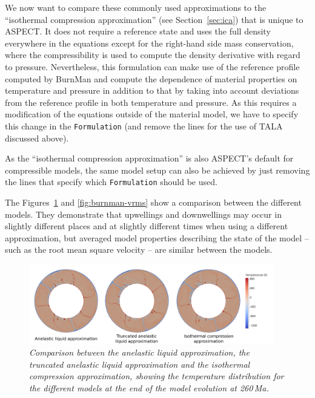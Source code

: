 \documentclass{article}
\newcommand{\aspect}{\textsc{ASPECT}}
\begin{document}
We now want to compare these commonly used approximations to the ``isothermal compression approximation''
(see Section~\ref{sec:ica}) that is unique to \aspect{}. It does not require a reference state and uses 
the full density everywhere in the equations except for the right-hand side  mass conservation, where the 
compressibility is used to compute the density derivative with regard to pressure. 
Nevertheless, this formulation can make use of the reference profile computed by BurnMan and compute the 
dependence of material properties on temperature and pressure in addition to that by taking into account 
deviations from the reference profile in both temperature and pressure. As this requires a modification 
of the equations outside of the material model, we have to specify this change in the 
\texttt{Formulation} (and remove the lines for the use of TALA discussed above). 

As the ``isothermal compression approximation'' is also \aspect{}'s default for compressible models, 
the same model setup can also be achieved by just removing the lines that specify which \texttt{Formulation}
should be used. 

The Figures~\ref{fig:burnman-comparison} and \ref{fig:burnman-vrms} show a comparison between the different 
models. They demonstrate that upwellings and downwellings may occur in slightly different places and at 
slightly different times when using a different approximation, but averaged model properties describing 
the state of the model -- such as the root mean square velocity -- are similar between the models. 

\begin{figure}
\centering
  \includegraphics[width=0.95\textwidth]{cookbooks/burnman/comparison.pdf}
  \caption{\it Comparison between the anelastic liquid approximation, 
               the truncated anelastic liquid approximation 
               and the isothermal compression approximation, 
               showing the temperature distribution for the different models at 
               the end of the model evolution at 260\,Ma.}
  \label{fig:burnman-comparison}
\end{figure}
\end{document}
